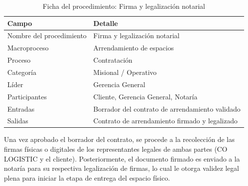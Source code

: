 \documentclass[11pt, a4paper, oneside]{report}
\begin{document}
\begin{table}[H]
\centering\small
\renewcommand{\arraystretch}{1.25}
\setlength{\tabcolsep}{6pt}
\begin{tabularx}{\textwidth}{|>{\raggedright\arraybackslash}p{}|>{\raggedright\arraybackslash}X|}
\hline
\rowcolor{upeu_mid}
\color{white}\bfseries Campo & \color{white}\bfseries Detalle \\ \hline
\rowcolor{gray!10}
Nombre del procedimiento & Firma y legalización notarial \\ \hline
\rowcolor{gray!10}
Macroproceso & Arrendamiento de espacios \\ \hline
Proceso & Contratación \\ \hline
\rowcolor{gray!10}
Categoría & Misional / Operativo \\ \hline
Líder & Gerencia General \\ \hline
\rowcolor{gray!10}
Participantes & Cliente, Gerencia General, Notaría \\ \hline
Entradas & Borrador del contrato de arrendamiento validado \\ \hline
\rowcolor{gray!10}
Salidas & Contrato de arrendamiento firmado y legalizado \\ \hline
\end{tabularx}
\caption{Ficha del procedimiento: Firma y legalización notarial}
\end{table}

Una vez aprobado el borrador del contrato, se procede a la recolección de las firmas físicas o digitales de los representantes legales de ambas partes (CO LOGISTIC y el cliente). Posteriormente, el documento firmado es enviado a la notaría para su respectiva legalización de firmas, lo cual le otorga validez legal plena para iniciar la etapa de entrega del espacio físico.
\end{document}
